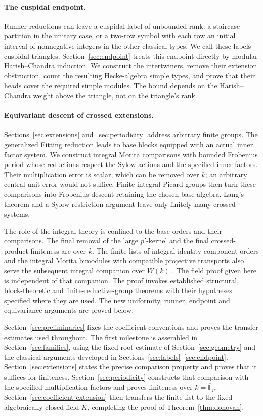 \paragraph{The cuspidal endpoint.}
Runner reductions can leave a cuspidal label of unbounded rank:
a staircase partition in the unitary case, or a two-row symbol
with each row an initial interval of nonnegative integers in the
other classical types.
We call these labels cuspidal triangles.
Section~\ref{sec:endpoint} treats this endpoint directly by modular
Harish--Chandra induction.  We construct the intertwiners, remove
their extension obstruction, count the resulting Hecke-algebra
simple types, and prove that their heads cover the required simple
modules.  The bound depends on the Harish--Chandra weight above the
triangle, not on the triangle's rank.

\paragraph{Equivariant descent of crossed extensions.}
Sections~\ref{sec:extensions} and~\ref{sec:periodicity} address
arbitrary finite groups.  The generalized Fitting reduction leads
to base blocks equipped with an actual inner factor system.
We construct integral Morita comparisons with bounded Frobenius
period whose reductions respect the Sylow actions and the
specified inner factors.
Their multiplication error is scalar, which can be removed over
\(k\); an arbitrary central-unit error would not suffice.
Finite integral Picard groups then turn these comparisons into
Frobenius descent retaining the chosen base algebra.
Lang's theorem and a Sylow restriction
argument leave only finitely many crossed systems.

The role of the integral theory is confined to the base orders and
their comparisons.  The final removal of the large \(p'\)-kernel
and the final crossed-product finiteness are over \(k\).
The finite lists of integral identity-component orders and the
integral Morita bimodules with compatible projective transports
also serve the subsequent integral companion over \(W(k)\)
\cite{OpenAIIntegralDonovan2026}.  The field proof given here is
independent of that companion.
The proof invokes established structural, block-theoretic and
finite-reductive-group theorems with their hypotheses specified
where they are used.  The new uniformity, runner, endpoint and
equivariance arguments are proved below.



Section~\ref{sec:preliminaries} fixes the coefficient conventions
and proves the transfer estimates used throughout.  The first
milestone is assembled in Section~\ref{sec:families}, using the
fixed-root estimate of Section~\ref{sec:geometry} and the classical
arguments developed in Sections~\ref{sec:labels}--\ref{sec:endpoint}.
Section~\ref{sec:extensions} states the precise comparison property
and proves that it suffices for finiteness.
Section~\ref{sec:periodicity} constructs that comparison with the
specified multiplication factors and proves finiteness over
\(k=\overline{\mathbb F}_p\).  Section~\ref{sec:coefficient-extension}
then transfers the finite list to the fixed algebraically closed field
\(K\), completing the proof of Theorem~\ref{thm:donovan}.
